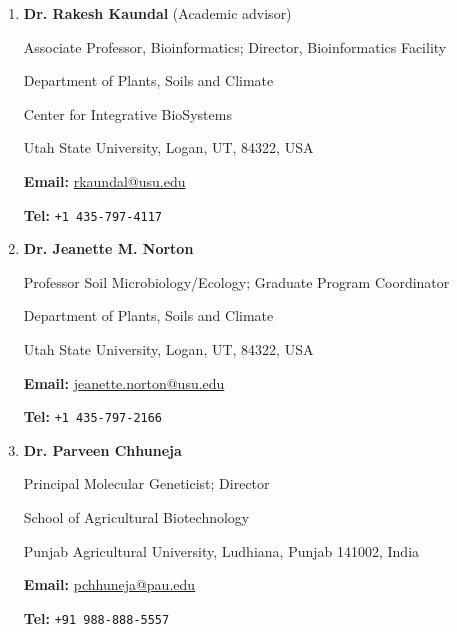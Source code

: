 
\setlength{\tabcolsep}{0.5em} %
\begin{enumerate}
\item \textbf{Dr.{} Rakesh Kaundal} (Academic advisor)\par
Associate Professor, Bioinformatics; Director, Bioinformatics Facility\par
Department of Plants, Soils and Climate\par
Center for Integrative BioSystems\par 
Utah State University, Logan, UT, 84322, USA\par

\textbf{Email:} \url{rkaundal@usu.edu}\par
\textbf{Tel:} {\texttt{+1 435-{}797-{}4117}}

\item \textbf{Dr.{} Jeanette M. Norton }\par 
Professor Soil Microbiology/Ecology; Graduate Program Coordinator\par
Department of Plants, Soils and Climate\par
Utah State University, Logan, UT, 84322, USA\par
\textbf{Email:} \url{jeanette.norton@usu.edu}\par
\textbf{Tel:} {\texttt{+1 435-{}797-{}2166}}

\item \textbf{Dr.{} Parveen Chhuneja  }\par 
Principal Molecular Geneticist; Director\par
School of Agricultural Biotechnology \par
Punjab Agricultural University, Ludhiana, Punjab 141002, India \par
\textbf{Email:} \url{pchhuneja@pau.edu}\par
\textbf{Tel:} {\texttt{+91 988-{}888-{}5557}}



\end{enumerate}
